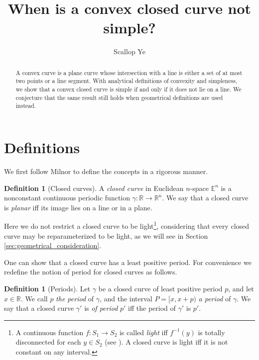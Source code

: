 \documentclass{amsart}
\title{When is a convex closed curve not simple?}
\author{Scallop Ye}
\theoremstyle{definition}
\newtheorem{definition}[proposition]{Definition}
\theoremstyle{remark}
\begin{document}
\begin{abstract}
    A convex curve is a plane curve whose intersection with a
    line is either a set of at most two points or a line segment.
    With analytical definitions of convexity and simpleness,
    we show that a convex closed curve is simple
    if and only if it does not lie on a line.
    We conjecture that the same result still holds when
    geometrical definitions are used instead.
\end{abstract}

\maketitle

\section{Definitions}

We first follow Milnor \cite{milnor} to
define the concepts in a rigorous manner.

\begin{definition}[Closed curves]
    A \emph{closed curve} in Euclidean $n$-space $\mathbb{E}^n$
    is a nonconstant continuous periodic function
    $\gamma:\mathbb{R}\to\mathbb{R}^n$. We say that a closed curve
    is \emph{planar} iff its image lies on a line or in a plane.
\end{definition}

Here we do not restrict a closed curve to be light\footnote{
    A continuous function $f:S_1\to S_2$ is called \emph{light}
    iff $f^{-1}(y)$ is totally disconnected for each $y\in S_2$
    (see \cite[Definition 13.1]{nadler}). A closed curve
    is light iff it is not constant on any interval.
}, considering that every closed curve may be
reparameterized to be light, as we will see in Section
\ref{sec:geometrical_consideration}.

One can show that a closed curve has a least positive period.
For convenience we redefine the notion of period for closed curves
as follows.

\begin{definition}[Periods]
    Let $\gamma$ be a closed curve of least positive period $p$,
    and let $x\in\mathbb{R}$. We call $p$ \emph{the period} of $\gamma$,
    and the interval $P=[x,x+p)$ \emph{a period} of $\gamma$.
    We say that a closed curve $\gamma'$ is \emph{of period} $p'$
    iff the period of $\gamma'$ is $p'$.
\end{definition}
\end{document}
